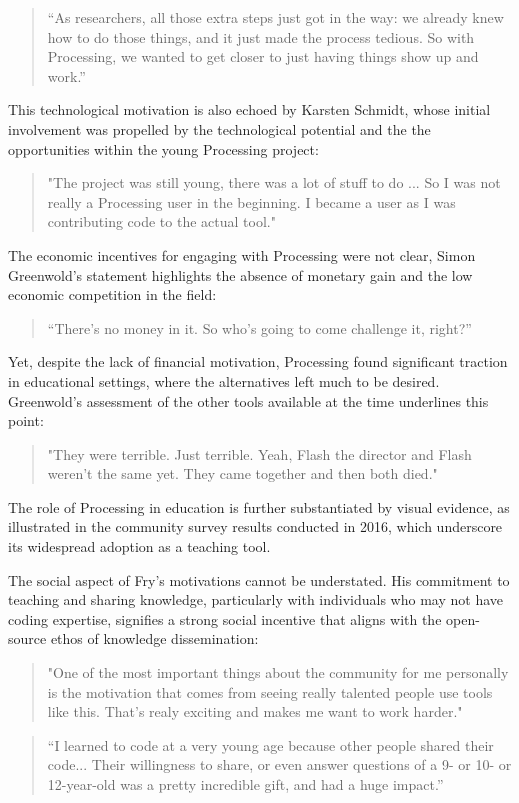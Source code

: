 \begin{quote}
	“As researchers, all those extra steps just got in the way: we already knew how to do those things, and it just made the process tedious. So with Processing, we wanted to get closer to just having things show up and work.” 
\end{quote}

This technological motivation is also echoed by Karsten Schmidt, whose initial involvement was propelled by the technological potential and the the opportunities within the young Processing project:

\begin{quote}
"The project was still young, there was a lot of stuff to do ... So I was not really a Processing user in the beginning. I became a user as I was contributing code to the actual tool." 
\end{quote}

The economic incentives for engaging with Processing were not clear, Simon Greenwold’s statement highlights the absence of monetary gain and the low economic competition in the field:
\begin{quote}
	“There's no money in it. So who's going to come challenge it, right?” 
\end{quote}
	
Yet, despite the lack of financial motivation, Processing found significant traction in educational settings, where the alternatives left much to be desired. Greenwold’s assessment of the other tools available at the time underlines this point:
	
\begin{quote}
"They were terrible. Just terrible. Yeah, Flash the director and Flash weren't the same yet. They came together and then both died." 
\end{quote}

The role of Processing in education is further substantiated by visual evidence, as illustrated in the community survey results conducted in 2016, which underscore its widespread adoption as a teaching tool.

The social aspect of Fry’s motivations cannot be understated. His commitment to teaching and sharing knowledge, particularly with individuals who may not have coding expertise, signifies a strong social incentive that aligns with the open-source ethos of knowledge dissemination:

\begin{quote}
	"One of the most important things about the community for me personally is the motivation that comes from seeing really talented people use tools like this. That's realy exciting and makes me want to work harder."
\end{quote}
\begin{quote}
“I learned to code at a very young age because other people shared their code... Their willingness to share, or even answer questions of a 9- or 10- or 12-year-old was a pretty incredible gift, and had a huge impact.” 
\end{quote}


